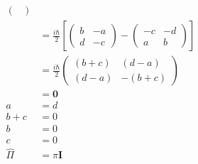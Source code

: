 \documentclass{article}
\renewcommand{\vec}[1]{\boldsymbol{\mathbf{#1}}}
\begin{document}
\begin{align*}
\begin{pmatrix}
                                                                                                             \end{pmatrix} \\
                         & = \frac{i \hbar}{2} \left[ \begin{pmatrix}
                                                          b & -a \\
                                                          d & -c
                                                        \end{pmatrix} - \begin{pmatrix}
                                                                          -c & -d \\
                                                                          a  & b
                                                                        \end{pmatrix} \right]                                 \\
                         & = \frac{i \hbar}{2} \begin{pmatrix}
                                                 (b + c) & (d - a)  \\
                                                 (d - a) & -(b + c)
                                               \end{pmatrix}                                                           \\
                         & = \vec{0}                                                                                        \\
  a                      & = d                                                                                              \\
  b + c                  & = 0                                                                                              \\
  b                      & = 0                                                                                              \\
  c                      & = 0                                                                                              \\
  \hat{\Pi}              & = \pi \vec{I}
\end{align*}

\subsection{}
\end{document}
